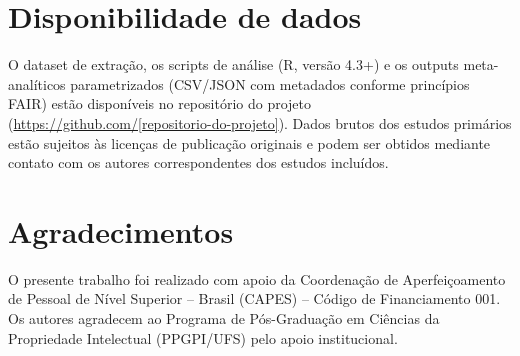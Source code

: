 \section*{Disponibilidade de dados}

O dataset de extração, os scripts de análise (R, versão 4.3+) e os outputs meta-analíticos parametrizados (CSV/JSON com metadados conforme princípios FAIR) estão disponíveis no repositório do projeto (\url{https://github.com/[repositorio-do-projeto]}). Dados brutos dos estudos primários estão sujeitos às licenças de publicação originais e podem ser obtidos mediante contato com os autores correspondentes dos estudos incluídos.


\section*{Agradecimentos}

O presente trabalho foi realizado com apoio da Coordenação de Aperfeiçoamento de Pessoal de Nível Superior -- Brasil (CAPES) -- Código de Financiamento 001. Os autores agradecem ao Programa de Pós-Graduação em Ciências da Propriedade Intelectual (PPGPI/UFS) pelo apoio institucional.


